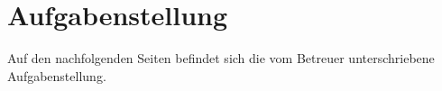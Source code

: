 \section{Aufgabenstellung}

Auf den nachfolgenden Seiten befindet sich die vom Betreuer unterschriebene Aufgabenstellung.

\newpage

